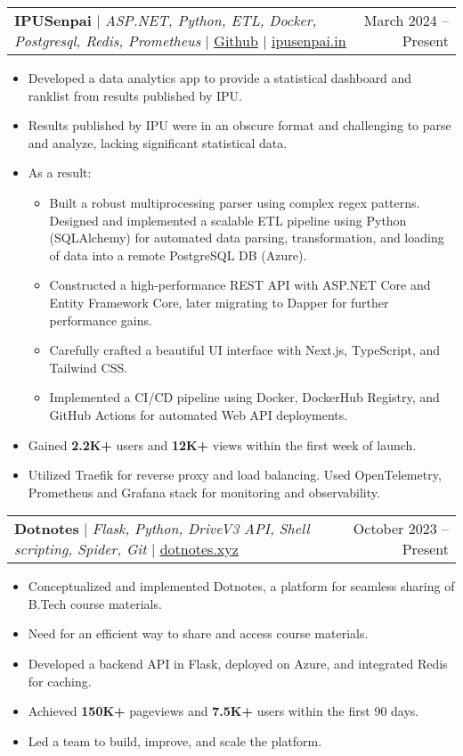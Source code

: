 \documentclass[letterpaper,11pt]{article}
\makeatletter
\newcommand{\resumeItem}[1]{
  \item\small{
    {#1 \vspace{-2pt}}
  }
}
\newcommand{\resumeProjectHeading}[2]{
    \item
    \begin{tabular*}{0.97\textwidth}{l@{\extracolsep{\fill}}r}
      \small#1 & #2 \\
    \end{tabular*}\vspace{-7pt}
}
\newcommand{\resumeItemListStart}{\begin{itemize}}
\newcommand{\resumeItemListEnd}{\end{itemize}\vspace{-5pt}}
\makeatother
\begin{document}
      \resumeProjectHeading
          {\textbf{IPUSenpai} $|$ \emph{ASP.NET, Python, ETL, Docker, Postgresql, Redis, Prometheus} $|$ \href{https://github.com/martian0x80/IPUSenpaiBackend}{\color{blue}\underline{Github}} $|$ \href{https://devel.ipusenpai.in}{\color{blue}\underline{ipusenpai.in}}}{March 2024 -- Present}
          \resumeItemListStart
            \resumeItem{Developed a data analytics app to provide a statistical dashboard and ranklist from results published by IPU.}
            \resumeItem{Results published by IPU were in an obscure format and challenging to parse and analyze, lacking significant statistical data.}
            \resumeItem{As a result:
              \begin{itemize}
                \item Built a robust multiprocessing parser using complex regex patterns. Designed and implemented a scalable ETL pipeline using Python (SQLAlchemy) for automated data parsing, transformation, and loading of data into a remote PostgreSQL DB (Azure).
                \item Constructed a high-performance REST API with ASP.NET Core and Entity Framework Core, later migrating to Dapper for further performance gains.
                \item Carefully crafted a beautiful UI interface with Next.js, TypeScript, and Tailwind CSS.
                \item Implemented a CI/CD pipeline using Docker, DockerHub Registry, and GitHub Actions for automated Web API deployments.
              \end{itemize}
            }
            \resumeItem{Gained \textbf{2.2K+} users and \textbf{12K+} views within the first week of launch.}
            \resumeItem{Utilized Traefik for reverse proxy and load balancing. Used OpenTelemetry, Prometheus and Grafana stack for monitoring and observability.}
          \resumeItemListEnd
      
      \resumeProjectHeading
          {\textbf{Dotnotes} $|$ \emph{Flask, Python, DriveV3 API, Shell scripting, Spider, Git} $|$ \href{https://www.dotnotes.xyz/}{\color{blue}\underline{dotnotes.xyz}}}{October 2023 -- Present}
          \resumeItemListStart
            \resumeItem{Conceptualized and implemented Dotnotes, a platform for seamless sharing of B.Tech course materials.}
            \resumeItem{Need for an efficient way to share and access course materials.}
            \resumeItem{Developed a backend API in Flask, deployed on Azure, and integrated Redis for caching.}
            \resumeItem{Achieved \textbf{150K+} pageviews and \textbf{7.5K+} users within the first 90 days.}
            \resumeItem{Led a team to build, improve, and scale the platform.}
          \resumeItemListEnd
\end{document}
